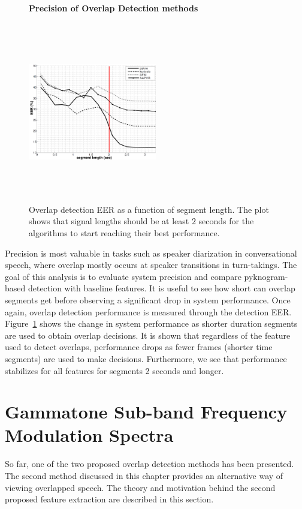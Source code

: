 {\begin{figure}[h!]
	\centering
	\hspace{-1mm}
	\textbf{Precision of Overlap Detection methods}\par\medskip
	\includegraphics[height = 3.1in, width=0.5\textwidth]{figures/eer_vs_time}
	\vspace{-1mm}
	\caption{ Overlap detection EER as a function of segment length. The plot shows that signal lengths should be at least $2$ seconds for the algorithms to start reaching their best performance.}
	\vspace{0mm}
	\label{fig:ch2_ovl_det_precision}
\end{figure}


Precision is most valuable in tasks such as speaker diarization in conversational speech, where overlap mostly occurs at speaker transitions in turn-takings. 
The goal of this analysis is to evaluate system precision and compare pyknogram-based detection with baseline features. 
It is useful to see how short can overlap segments get before observing a significant drop in system performance. 
Once again, overlap detection performance is measured through the detection EER. 
Figure~\ref{fig:ch2_ovl_det_precision} shows the change in system performance as shorter duration segments are used to obtain overlap decisions. 
It is shown that regardless of the feature used to detect overlaps, performance drops as fewer frames (shorter time segments) are used to make decisions. 
Furthermore, we see that performance stabilizes for all features for segments 2 seconds and longer. 


\newpage
\section{Gammatone Sub-band Frequency Modulation Spectra}
\label{sec:ch2_GSFM}
So far, one of the two proposed overlap detection methods has been presented. 
The second method discussed in this chapter provides an alternative way of viewing overlapped speech. 
The theory and motivation behind the second proposed feature extraction are described in this section. 

}
